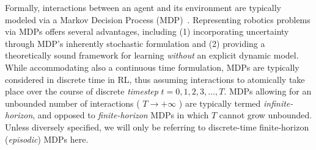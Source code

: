 Formally, interactions between an agent and its environment are typically modeled via a Markov Decision Process (MDP)~\citep{bellmanMarkovianDecisionProcess1957}.
Representing robotics problems via MDPs offers several advantages, including (1) incorporating uncertainty through MDP's inherently stochastic formulation and (2) providing a theoretically sound framework for learning \emph{without} an explicit dynamic model.
While accommodating also a continuous time formulation, MDPs are typically considered in discrete time in RL, thus assuming interactions to atomically take place over the course of discrete \emph{timestep} \( t=0,1,2,3, \dots, T \).
MDPs allowing for an unbounded number of interactions ( \( T \to + \infty \) ) are typically termed \emph{infinite-horizon}, and opposed to \emph{finite-horizon} MDPs in which \( T \) cannot grow unbounded.
Unless diversely specified, we will only be referring to discrete-time finite-horizon (\emph{episodic}) MDPs here.

